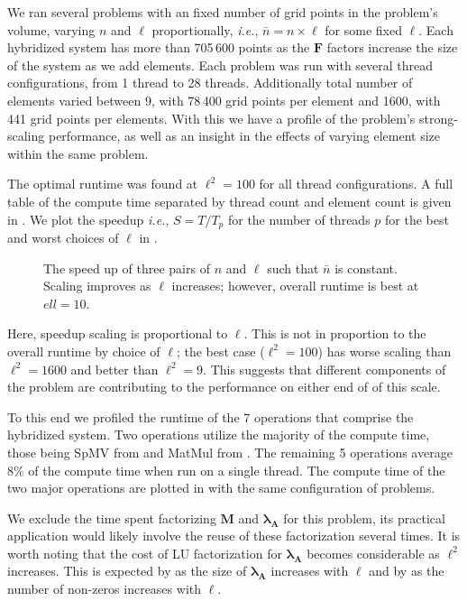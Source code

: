 %
%
%
We ran several problems with an fixed number of grid points in the problem's volume, varying $n$ and $\ell$ proportionally, \emph{i.e.}, $\bar{n} = n \times \ell$ for some fixed $\ell$.
Each hybridized system has more than 705\,600 points as the $\textbf{F}$  factors increase the size of the system as we add elements.
Each problem was run with several thread configurations, from 1 thread to 28 threads. 
Additionally total number of elements varied between 9, with 78\,400 grid points per element and 1600, with 441 grid points per elements. 
With this we have a profile of the problem's strong-scaling performance, as well as an insight in the effects of varying element size within the same problem.  

%
%
%
The optimal runtime was found at $\ell^2 = 100$ for all thread configurations. 
A full table of the compute time separated by thread count and element count is given in .
We plot the speedup \emph{i.e.}, $S = T/T_{p}$ for the number of threads $p$ for the best and worst choices of $\ell$ in .

%
%
%
\begin{figure}[h]
	
	\caption{
	    The speed up of three pairs of $n$ and $\ell$ such that $\bar{n}$ is constant. 
	    Scaling improves as $\ell$ increases; however, overall runtime is best at $ell = 10$. 
	    }
    \label{fig:sca_exp_a}
\end{figure}

Here, speedup scaling is proportional to $\ell$. 
This is not in proportion to the overall runtime by choice of $\ell$; the best case ($\ell^2 = 100$) has worse scaling than $\ell^2 = 1600$ and better than $\ell^2 = 9$.
This suggests that different components of the problem are contributing to the performance on either end of of this scale. 

%
%
%
To this end we profiled the runtime of the 7 operations that comprise the hybridized system. 
Two operations utilize the majority of the compute time, those being SpMV from  and MatMul from .
The remaining 5 operations average $8\%$ of the compute time when run on a single thread. 
The compute time of the two major operations are plotted in  with the same configuration of problems. 

%
%
%


%
%
%
We exclude the time spent factorizing $\textbf{M}$ and $\symbf{\lambda}_{\textbf{A}}$ for this problem, its practical application would likely involve the reuse of these factorization several times. 
It is worth noting that the cost of LU factorization for $\symbf{\lambda}_{\textbf{A}}$ becomes considerable as $\ell^2$ increases. 
This is expected by  as the size of $\symbf{\lambda}_{\textbf{A}}$ increases with $\ell$ and by  as the number of non-zeros increases with $\ell$.


